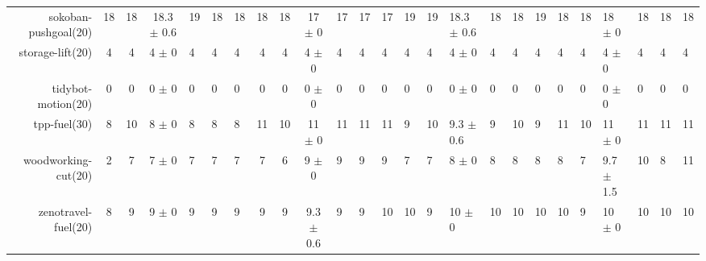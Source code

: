 \begin{center}
\begin{tabular}{|rcccHHH|cccHHHHHHHHHHHHHHH|}
sokoban-pushgoal(20) & 18 & 18 & 18.3 $\pm$ 0.6 & 19 & 18 & 18 & 18 & 18 & 17 $\pm$ 0 & 17 & 17 & 17 & 19 & 19 & 18.3 $\pm$ 0.6 & 18 & 18 & 19 & 18 & 18 & 18 $\pm$ 0 & 18 & 18 & 18\\
storage-lift(20) & 4 & 4 & 4 $\pm$ 0 & 4 & 4 & 4 & 4 & 4 & 4 $\pm$ 0 & 4 & 4 & 4 & 4 & 4 & 4 $\pm$ 0 & 4 & 4 & 4 & 4 & 4 & 4 $\pm$ 0 & 4 & 4 & 4\\
tidybot-motion(20) & 0 & 0 & 0 $\pm$ 0 & 0 & 0 & 0 & 0 & 0 & 0 $\pm$ 0 & 0 & 0 & 0 & 0 & 0 & 0 $\pm$ 0 & 0 & 0 & 0 & 0 & 0 & 0 $\pm$ 0 & 0 & 0 & 0\\
tpp-fuel(30) & 8 & 10 & 8 $\pm$ 0 & 8 & 8 & 8 & 11 & 10 & 11 $\pm$ 0 & 11 & 11 & 11 & 9 & 10 & 9.3 $\pm$ 0.6 & 9 & 10 & 9 & 11 & 10 & 11 $\pm$ 0 & 11 & 11 & 11\\
woodworking-cut(20) & 2 & 7 & 7 $\pm$ 0 & 7 & 7 & 7 & 7 & 6 & 9 $\pm$ 0 & 9 & 9 & 9 & 7 & 7 & 8 $\pm$ 0 & 8 & 8 & 8 & 8 & 7 & 9.7 $\pm$ 1.5 & 10 & 8 & 11\\
zenotravel-fuel(20) & 8 & 9 & 9 $\pm$ 0 & 9 & 9 & 9 & 9 & 9 & 9.3 $\pm$ 0.6 & 9 & 9 & 10 & 10 & 9 & 10 $\pm$ 0 & 10 & 10 & 10 & 10 & 9 & 10 $\pm$ 0 & 10 & 10 & 10\\
\end{tabular}
\end{center}
